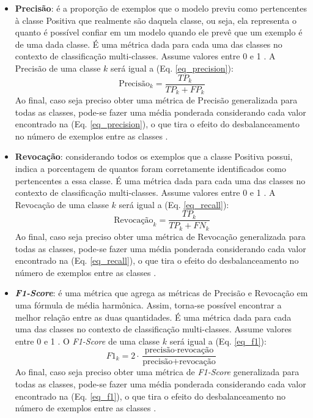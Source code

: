 \begin{itemize}
    \item \textbf{Precisão}: é a proporção de exemplos que o modelo previu como pertencentes à classe Positiva que realmente são daquela classe, ou seja, ela representa o quanto é possível confiar em um modelo quando ele prevê que um exemplo é de uma dada classe. É uma métrica dada para cada uma das classes no contexto de classificação multi-classes. Assume valores entre 0 e 1 \cite{metrics_survey}. A Precisão de uma classe $k$ será igual a (Eq. \ref{eq_precision}):
    \begin{equation}\label{eq_precision}
        \text{Precisão}_k = \dfrac{TP_k}{TP_k + FP_k}
    \end{equation}
    Ao final, caso seja preciso obter uma métrica de Precisão generalizada para todas as classes, pode-se fazer uma média ponderada considerando cada valor encontrado na (Eq. \ref{eq_precision}), o que tira o efeito do desbalanceamento no número de exemplos entre as classes \cite{sk}.
    \item \textbf{Revocação}: considerando todos os exemplos que a classe Positiva possui, indica a porcentagem de quantos foram corretamente identificados como pertencentes a essa classe. É uma métrica dada para cada uma das classes no contexto de classificação multi-classes. Assume valores entre 0 e 1 \cite{metrics_survey}. A Revocação de uma classe $k$ será igual a (Eq. \ref{eq_recall}):
    \begin{equation}\label{eq_recall}
        \text{Revocação}_k = \dfrac{TP_k}{TP_k + FN_k}
    \end{equation}
    Ao final, caso seja preciso obter uma métrica de Revocação generalizada para todas as classes, pode-se fazer uma média ponderada considerando cada valor encontrado na (Eq. \ref{eq_recall}), o que tira o efeito do desbalanceamento no número de exemplos entre as classes \cite{sk}.
    \item \textbf{\textit{F1-Score}}: é uma métrica que agrega as métricas de Precisão e Revocação em uma fórmula de média harmônica. Assim, torna-se possível encontrar a melhor relação entre as duas quantidades. É uma métrica dada para cada uma das classes no contexto de classificação multi-classes. Assume valores entre 0 e 1 \cite{metrics_survey}. O \textit{F1-Score} de uma classe $k$ será igual a (Eq. \ref{eq_f1}):
    \begin{equation}\label{eq_f1}
        {F1}_k = 2\cdot\dfrac{\text{precisão} \cdot \text{revocação}}{\text{precisão} + \text{revocação}}
    \end{equation}
    Ao final, caso seja preciso obter uma métrica de \textit{F1-Score} generalizada para todas as classes, pode-se fazer uma média ponderada considerando cada valor encontrado na (Eq. \ref{eq_f1}), o que tira o efeito do desbalanceamento no número de exemplos entre as classes \cite{sk}.
\end{itemize}

